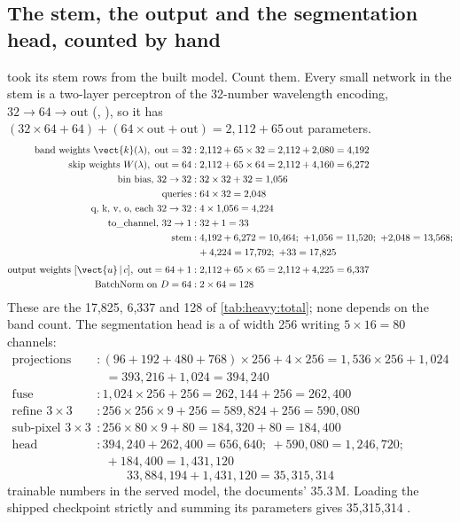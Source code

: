 \subsection{The stem, the output and the segmentation head, counted by hand}\label{sec:heavy:stemcount}

 took its stem rows from the built model. Count them. Every small network in the stem is a
two-layer perceptron of the 32-number wavelength encoding, $32\to64\to\text{out}$ (,
), so it has $(32\times64+64)+(64\times\text{out}+\text{out})=2{,}112+65\,\text{out}$ parameters.
\begin{align*}
\text{band weights } \vect{k}(\lambda),\ \text{out}=32 &: 2{,}112+65\times32 = 2{,}112+2{,}080 = 4{,}192\\
\text{skip weights } W(\lambda),\ \text{out}=64 &: 2{,}112+65\times64 = 2{,}112+4{,}160 = 6{,}272\\
\text{bin bias, } 32\to32 &: 32\times32+32 = 1{,}056\\
\text{queries} &: 64\times32 = 2{,}048\\
\text{q, k, v, o, each } 32\to32 &: 4\times1{,}056 = 4{,}224\\
\text{to\_channel, } 32\to1 &: 32+1 = 33\\
\text{stem} &: 4{,}192+6{,}272 = 10{,}464;\ +1{,}056 = 11{,}520;\ +2{,}048 = 13{,}568;\\
&\phantom{:}\ +4{,}224 = 17{,}792;\ +33 = 17{,}825\\[3pt]
\text{output weights } [\vect{u}\,|\,c],\ \text{out}=64+1 &: 2{,}112+65\times65 = 2{,}112+4{,}225 = 6{,}337\\
\text{BatchNorm on } D=64 &: 2\times64 = 128
\end{align*}
These are the 17,825, 6,337 and 128 of \cref{tab:heavy:total}; none depends on the band count. The segmentation
head is a  of width 256 writing $5\times16=80$ channels:
\begin{align*}
\text{projections} &: (96+192+480+768)\times256+4\times256 = 1{,}536\times256+1{,}024\\
&\phantom{:}\ = 393{,}216+1{,}024 = 394{,}240\\
\text{fuse} &: 1{,}024\times256+256 = 262{,}144+256 = 262{,}400\\
\text{refine } 3\times3 &: 256\times256\times9+256 = 589{,}824+256 = 590{,}080\\
\text{sub-pixel } 3\times3 &: 256\times80\times9+80 = 184{,}320+80 = 184{,}400\\
\text{head} &: 394{,}240+262{,}400 = 656{,}640;\ +590{,}080 = 1{,}246{,}720;\\
&\phantom{:}\ +184{,}400 = 1{,}431{,}120
\end{align*}
\begin{equation}\label{eq:heavy:served}
33{,}884{,}194+1{,}431{,}120 = 35{,}315{,}314
\end{equation}
trainable numbers in the served model, the documents' 35.3\,M. Loading the shipped checkpoint strictly and summing its
parameters gives 35,315,314 \tagC.

